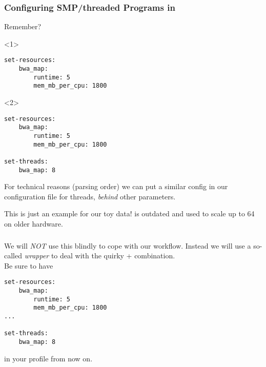 \begin{frame}[fragile]
	\frametitle{Configuring SMP/threaded Programs in \Snakemake}
	Remember?
	\begin{onlyenv}
	  \begin{lstlisting}[style=Plain]
set-resources:
    bwa_map:
        runtime: 5
        mem_mb_per_cpu: 1800
	  \end{lstlisting}	
	\end{onlyenv}
    \begin{onlyenv}<2>
	  \begin{lstlisting}[style=Plain]
set-resources:
	bwa_map:
		runtime: 5
		mem_mb_per_cpu: 1800
		
set-threads:
    bwa_map: 8
	\end{lstlisting}
    
    For technical reasons (parsing order) we can put a similar config in our configuration file for threads, \emph{behind} other parameters.
    
    \begin{warning}
    	This is just an example for our toy data!  is outdated and used to scale up to 64 on older hardware.
    \end{warning}
  \end{onlyenv}
\end{frame}

\begin{frame}[fragile]
	\frametitle{}
	We will \emph{NOT} use this blindly to cope with our workflow. Instead we will use a so-called \textit{wrapper} to deal with the quirky  +  combination.\\
	Be sure to have
	\begin{lstlisting}[style=Plain]
set-resources:
    bwa_map:
        runtime: 5
        mem_mb_per_cpu: 1800
...
		
set-threads:
    bwa_map: 8
	\end{lstlisting}
    in your profile from now on.
\end{frame}

